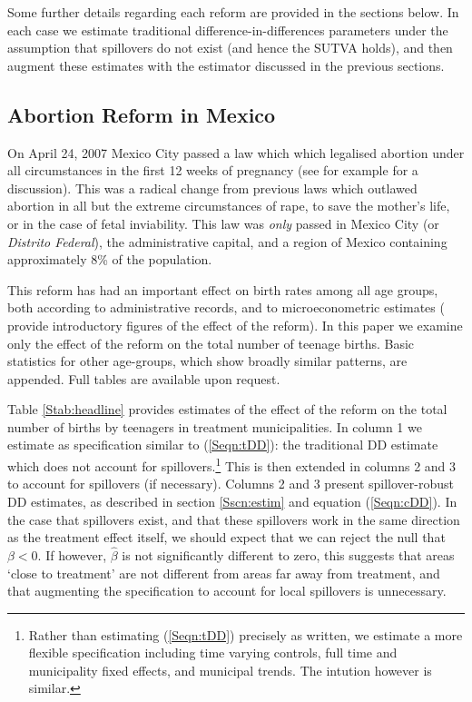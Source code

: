 \documentclass{article}
\begin{document}
\begin{spacing}{1.1}
Some further details regarding each reform are provided in the sections below.
In each case we estimate traditional difference-in-differences parameters under
the assumption that spillovers do not exist (and hence the SUTVA holds), and
then augment these estimates with the estimator discussed in the previous
sections.

\subsection{Abortion Reform in Mexico}
On April 24, 2007 Mexico City passed a law which which legalised abortion 
under all circumstances in the first 12 weeks of pregnancy (see for example
\citet{Fraser2014} for a discussion).  This was a radical change from previous 
laws which outlawed abortion in all but the extreme circumstances of rape, 
to save the mother's life, or in the case of fetal inviability.  This law was 
\emph{only} passed in Mexico City (or \emph{Distrito Federal}), the 
administrative capital, and a region of Mexico containing approximately 8\% 
of the population.

This reform has had an important effect on birth rates among all age groups,
both according to administrative records, and to microeconometric estimates
(\citet{ClarkeMuhlrad2014} provide introductory figures of the effect of the
reform).  In this paper we examine only the effect of the reform on the total
number of teenage births.  Basic statistics for other age-groups, which show 
broadly similar patterns, are appended.  Full tables are available upon 
request.

Table \ref{Stab:headline} provides estimates of the effect of the reform on
the total number of births by teenagers in treatment municipalities.  In 
column 1 we estimate as specification similar to (\ref{Seqn:tDD}): the 
traditional DD estimate which does not account for spillovers.\footnote{Rather 
than estimating (\ref{Seqn:tDD}) precisely as written, we estimate a more 
flexible specification including time varying controls, full time and
municipality fixed effects, and municipal trends.  The intution however is
similar.}  This is then extended in columns 2 and 3 to account for spillovers
(if necessary).  Columns 2 and 3 present spillover-robust DD estimates, as 
described in section \ref{Sscn:estim} and equation (\ref{Seqn:cDD}).  In the
case that spillovers exist, and that these spillovers work in the same 
direction as the treatment effect itself, we should expect that we can reject
the null that $\beta<0$.  If however, $\hat\beta$ is not significantly 
different to zero, this suggests that areas `close to treatment' are not
different from areas far away from treatment, and that augmenting the 
specification to account for local spillovers is unnecessary.


\end{spacing}
\end{document}

